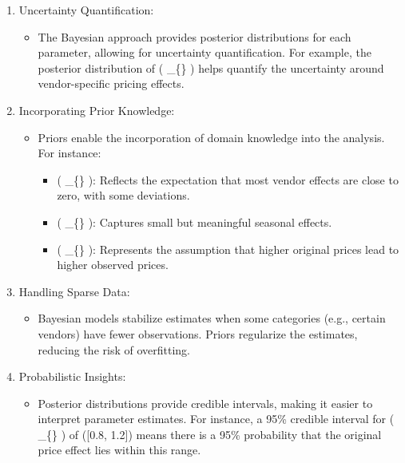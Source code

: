 \documentclass[
  letterpaper,
  DIV=11,
  numbers=noendperiod]{scrartcl}
\providecommand{\tightlist}{%
  \setlength{\itemsep}{0pt}\setlength{\parskip}{0pt}}\usepackage{longtable,booktabs,array}
\begin{document}
\begin{enumerate}
\def\labelenumi{\arabic{enumi}.}
\item
  Uncertainty Quantification:

  \begin{itemize}
  \tightlist
  \item
    The Bayesian approach provides posterior distributions for each
    parameter, allowing for uncertainty quantification. For example, the
    posterior distribution of ( \beta\_\{\} ) helps
    quantify the uncertainty around vendor-specific pricing effects.
  \end{itemize}
\item
  Incorporating Prior Knowledge:

  \begin{itemize}
  \tightlist
  \item
    Priors enable the incorporation of domain knowledge into the
    analysis. For instance:

    \begin{itemize}
    \tightlist
    \item
      ( \beta\_\{\} ): Reflects the expectation that most
      vendor effects are close to zero, with some deviations.
    \item
      ( \beta\_\{\} ): Captures small but meaningful
      seasonal effects.
    \item
      ( \beta\_\{\} ): Represents the assumption that
      higher original prices lead to higher observed prices.
    \end{itemize}
  \end{itemize}
\item
  Handling Sparse Data:

  \begin{itemize}
  \tightlist
  \item
    Bayesian models stabilize estimates when some categories (e.g.,
    certain vendors) have fewer observations. Priors regularize the
    estimates, reducing the risk of overfitting.
  \end{itemize}
\item
  Probabilistic Insights:

  \begin{itemize}
  \tightlist
  \item
    Posterior distributions provide credible intervals, making it easier
    to interpret parameter estimates. For instance, a 95\% credible
    interval for ( \beta\_\{\} ) of ({[}0.8, 1.2{]})
    means there is a 95\% probability that the original price effect
    lies within this range.
  \end{itemize}
\end{enumerate}
\end{document}
